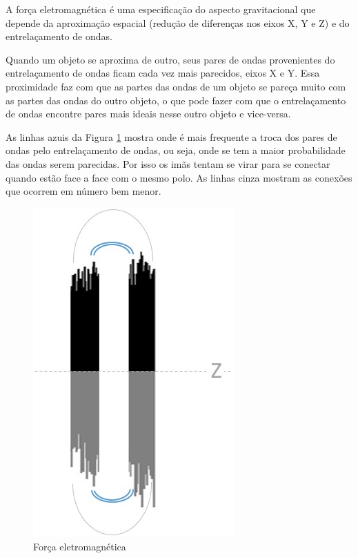 A força eletromagnética é uma especificação do aspecto gravitacional que depende da aproximação espacial (redução de diferenças nos eixos X, Y e Z) e do entrelaçamento de ondas.

Quando um objeto se aproxima de outro, seus pares de ondas provenientes do entrelaçamento de ondas ficam cada vez mais parecidos, eixos X e Y. Essa proximidade faz com que as partes das ondas de um objeto se pareça muito com as partes das ondas do outro objeto, o que pode fazer com que o entrelaçamento de ondas encontre pares mais ideais nesse outro objeto e vice-versa.  

As linhas azuis da Figura \ref{fig:consciousness_electromaagnetic_force} mostra onde é mais frequente a troca dos pares de ondas pelo entrelaçamento de ondas, ou seja, onde se tem a maior probabilidade das ondas serem parecidas. Por isso os imãs tentam se virar para se conectar quando estão face a face com o mesmo polo. As linhas cinza mostram as conexões que ocorrem em número bem menor. 
	\begin{figure}[H]
	\caption{Força eletromagnética}
	\label{fig:consciousness_electromaagnetic_force}
	\centering
	\includegraphics[scale=.6]{sections/images/consciousness_electromaagnetic_force.jpg}
	\end{figure}

